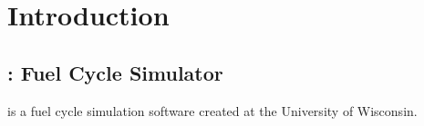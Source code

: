 \chapter{Introduction}
\section{\Cyclus : Fuel Cycle Simulator}
\Cyclus is a fuel cycle simulation software created at the University of Wisconsin. 

